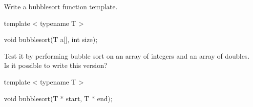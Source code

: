 Write a bubblesort function template.



\begin{console}

template  < typename T >

void bubblesort(T a[], int size); 

\end{console}



Test it by performing bubble sort on an array of integers and an array of doubles. Is it possible to write this version?



\begin{console}

template  < typename T >

void bubblesort(T * start, T * end); 

\end{console}

